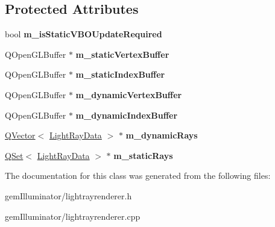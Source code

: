 \subsection*{Protected Attributes}
\begin{DoxyCompactItemize}
\item 
\hypertarget{class_light_ray_renderer_a9931d2944cabf289973c862a714fc5fd}{}bool {\bfseries m\+\_\+is\+Static\+V\+B\+O\+Update\+Required}\label{class_light_ray_renderer_a9931d2944cabf289973c862a714fc5fd}

\item 
\hypertarget{class_light_ray_renderer_af21bb4b6a08c84b13753860a0a89b199}{}Q\+Open\+G\+L\+Buffer $\ast$ {\bfseries m\+\_\+static\+Vertex\+Buffer}\label{class_light_ray_renderer_af21bb4b6a08c84b13753860a0a89b199}

\item 
\hypertarget{class_light_ray_renderer_ab78cd6dadbb241b4d8929f5f1b60995a}{}Q\+Open\+G\+L\+Buffer $\ast$ {\bfseries m\+\_\+static\+Index\+Buffer}\label{class_light_ray_renderer_ab78cd6dadbb241b4d8929f5f1b60995a}

\item 
\hypertarget{class_light_ray_renderer_ae8c0c8b69c3dda2e8e535f3c7da7543f}{}Q\+Open\+G\+L\+Buffer $\ast$ {\bfseries m\+\_\+dynamic\+Vertex\+Buffer}\label{class_light_ray_renderer_ae8c0c8b69c3dda2e8e535f3c7da7543f}

\item 
\hypertarget{class_light_ray_renderer_afe1bab9c62f8e91c45df4680f1f878a9}{}Q\+Open\+G\+L\+Buffer $\ast$ {\bfseries m\+\_\+dynamic\+Index\+Buffer}\label{class_light_ray_renderer_afe1bab9c62f8e91c45df4680f1f878a9}

\item 
\hypertarget{class_light_ray_renderer_a994b774bb19f4d310593b18a40a41af7}{}\hyperlink{class_q_vector}{Q\+Vector}$<$ \hyperlink{class_light_ray_data}{Light\+Ray\+Data} $>$ $\ast$ {\bfseries m\+\_\+dynamic\+Rays}\label{class_light_ray_renderer_a994b774bb19f4d310593b18a40a41af7}

\item 
\hypertarget{class_light_ray_renderer_a6524c19725083f59fe41616998dcf111}{}\hyperlink{class_q_set}{Q\+Set}$<$ \hyperlink{class_light_ray_data}{Light\+Ray\+Data} $>$ $\ast$ {\bfseries m\+\_\+static\+Rays}\label{class_light_ray_renderer_a6524c19725083f59fe41616998dcf111}

\end{DoxyCompactItemize}


The documentation for this class was generated from the following files\+:\begin{DoxyCompactItemize}
\item 
gem\+Illuminator/lightrayrenderer.\+h\item 
gem\+Illuminator/lightrayrenderer.\+cpp\end{DoxyCompactItemize}
